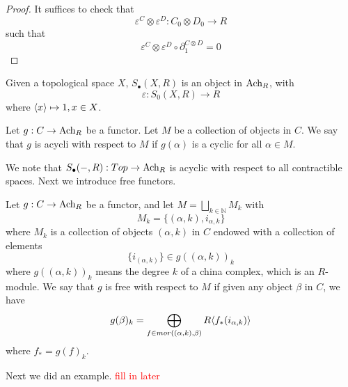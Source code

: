 \begin{proof}
    It suffices to check that 
    \begin{equation*}
        \varepsilon^C\otimes\varepsilon^D: C_0\otimes D_0\to R
    \end{equation*}
    such that 
    \begin{equation*}
        \varepsilon^C\otimes\varepsilon^D\circ\partial_1^{C\otimes D}=0
    \end{equation*}
\end{proof}
\begin{example}
    Given a topological space $X$, $S_\bullet(X,R)$ is an object in $\text{Ach}_R$, with 
    \begin{equation*}
        \varepsilon:S_0(X,R)\to R
    \end{equation*}
    where $\langle x\rangle\mapsto 1, x\in X$.
\end{example}
\begin{defn}
    Let $g:C\to\text{Ach}_R$ be a functor. Let $M$ be a collection of objects in $C$. We say that $g$ is acycli with respect to $M$ if $g(\alpha)$ is a cyclic for all $\alpha\in M$.
\end{defn}
We note that $S_\bullet(-,R):Top\to\text{Ach}_R$ is acyclic with respect to all contractible spaces. Next we introduce free functors.
\begin{defn}
    Let $g:C\to\text{Ach}_R$ be a functor, and let $M=\bigsqcup_{k\in\mathbb{N}}M_k$ with 
    \begin{equation*}
        M_k=\{(\alpha,k), i_{\alpha,k}\}
    \end{equation*}
    where $M_k$ is a collection of objects $(\alpha,k)$ in $C$ endowed with a collection of elements 
    \begin{equation*}
        \{i_{(\alpha,k)}\}\in g((\alpha,k))_k
    \end{equation*}
    where $g((\alpha,k))_k$ means the degree $k$ of a china complex, which is an $R$-module. We say that $g$ is free with respect to $M$ if given any object $\beta$ in $C$, we have 
    \begin{equation*}
        g(\beta)_k=\bigoplus_{f\in mor((\alpha,k),\beta)}R\langle f_*(i_{\alpha,k})\rangle
    \end{equation*}
    where $f_*=g(f)_k$.
\end{defn}
Next we did an example. \textcolor{red}{fill in later}

